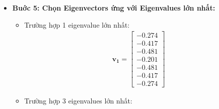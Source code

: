 \begin{itemize}
\begin{align*}
                    \end{align*}
                    \begin{align*}
                        \mathbf{V} = \begin{bmatrix}
                        -0.274 & -0.102 & -0.502 & 0.403 & 0.625 & 0.175 & -0.281 \\
                        -0.417 & -0.416 & -0.003 & -0.392 & -0.329 & 0.397 & -0.484 \\
                        -0.481 & 0.273 & 0.383 & 0.219 & -0.038 & -0.558 & -0.433 \\
                        -0.201 & 0.696 & -0.450 & -0.522 & 0 & 0 & 0 \\
                        -0.481 & 0.273 & 0.383 & 0.219 & 0.038 & 0.558 & 0.433 \\
                        -0.417 & -0.416 & -0.003 & -0.392 & 0.329 & -0.397 & 0.484 \\
                        -0.274 & -0.102 & -0.502 & 0.403 & -0.625 & -0.175 & 0.281
                        \end{bmatrix}
                    \end{align*}
                \item \textbf{Buớc 5: Chọn Eigenvectors ứng với Eigenvalues lớn nhất:}
                    \begin{itemize}
                        \item Trường hợp 1 eigenvalue lớn nhất:
                            \begin{align*}
                                \mathbf{v_1} = \begin{bmatrix}
                                -0.274 \\
                                -0.417 \\
                                -0.481 \\
                                -0.201 \\
                                -0.481 \\
                                -0.417 \\
                                -0.274
                                \end{bmatrix}
                            \end{align*}
                        \item Trường hợp 3 eigenvalues lớn nhất:
                            \begin{align*}

\end{align*}
\end{itemize}
\end{itemize}
